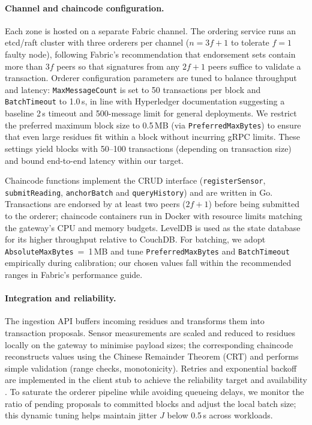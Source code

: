 \documentclass[12pt,onecolumn]{IEEEtran} %
\begin{document}
\paragraph{Channel and chaincode configuration.}
Each zone is hosted on a separate Fabric channel. The ordering service runs an etcd/raft cluster with three orderers per channel ($n=3f+1$ to tolerate $f=1$ faulty node), following Fabric’s recommendation that endorsement sets contain more than $3f$ peers so that signatures from any $2f+1$ peers suffice to validate a transaction. Orderer configuration parameters are tuned to balance throughput and latency: \texttt{MaxMessageCount} is set to 50 transactions per block and \texttt{BatchTimeout} to 1.0\,s, in line with Hyperledger documentation suggesting a baseline 2\,s timeout and 500-message limit for general deployments. We restrict the preferred maximum block size to 0.5\,MB (via \texttt{PreferredMaxBytes}) to ensure that even large residues fit within a block without incurring gRPC limits. These settings yield blocks with 50–100 transactions (depending on transaction size) and bound end-to-end latency within our \SLOpL{} target.

Chaincode functions implement the CRUD interface (\texttt{registerSensor}, \texttt{submitReading}, \texttt{anchorBatch} and \texttt{queryHistory}) and are written in Go. Transactions are endorsed by at least two peers ($2f{+}1$) before being submitted to the orderer; chaincode containers run in Docker with resource limits matching the gateway’s CPU and memory budgets. LevelDB is used as the state database for its higher throughput relative to CouchDB. For batching, we adopt \texttt{AbsoluteMaxBytes}~=~1\,MB and tune \texttt{PreferredMaxBytes} and \texttt{BatchTimeout} empirically during calibration; our chosen values fall within the recommended ranges in Fabric’s performance guide.

\paragraph{Integration and reliability.}
The ingestion API buffers incoming residues and transforms them into transaction proposals. Sensor measurements are scaled and reduced to residues locally on the gateway to minimise payload sizes; the corresponding chaincode reconstructs values using the Chinese Remainder Theorem (CRT) and performs simple validation (range checks, monotonicity). Retries and exponential backoff are implemented in the client stub to achieve the reliability target \SLOR{} and availability \SLOA{}. To saturate the orderer pipeline while avoiding queueing delays, we monitor the ratio of pending proposals to committed blocks and adjust the local batch size; this dynamic tuning helps maintain jitter $J$ below 0.5\,s across workloads.
\end{document}
